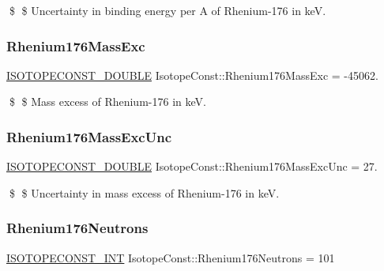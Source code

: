 \$ \$ Uncertainty in binding energy per A of Rhenium-\/176 in keV. \mbox{\label{group___isotope_const-_rhenium-_re176_ga1b0fb55f16ccbbf1f5522bef56bafc0a}} 
\subsubsection{\texorpdfstring{Rhenium176\+Mass\+Exc}{Rhenium176MassExc}}
{\footnotesize\ttfamily \mbox{\hyperlink{group___isotope_const-_macros_ga8f45a7272ce02c0b4c65c44636ed719a}{I\+S\+O\+T\+O\+P\+E\+C\+O\+N\+S\+T\+\_\+\+D\+O\+U\+B\+LE}} Isotope\+Const\+::\+Rhenium176\+Mass\+Exc = -\/45062.}

\$ \$ Mass excess of Rhenium-\/176 in keV. \mbox{\label{group___isotope_const-_rhenium-_re176_ga68af55ab3bbe3c642053964315cd9ce1}} 
\subsubsection{\texorpdfstring{Rhenium176\+Mass\+Exc\+Unc}{Rhenium176MassExcUnc}}
{\footnotesize\ttfamily \mbox{\hyperlink{group___isotope_const-_macros_ga8f45a7272ce02c0b4c65c44636ed719a}{I\+S\+O\+T\+O\+P\+E\+C\+O\+N\+S\+T\+\_\+\+D\+O\+U\+B\+LE}} Isotope\+Const\+::\+Rhenium176\+Mass\+Exc\+Unc = 27.}

\$ \$ Uncertainty in mass excess of Rhenium-\/176 in keV. \mbox{\label{group___isotope_const-_rhenium-_re176_gaf3d60584ae453a8e78d659b92866bf1e}} 
\subsubsection{\texorpdfstring{Rhenium176\+Neutrons}{Rhenium176Neutrons}}
{\footnotesize\ttfamily \mbox{\hyperlink{group___isotope_const-_macros_ga5f18360b3e99483a35c32d789e62621c}{I\+S\+O\+T\+O\+P\+E\+C\+O\+N\+S\+T\+\_\+\+I\+NT}} Isotope\+Const\+::\+Rhenium176\+Neutrons = 101}

